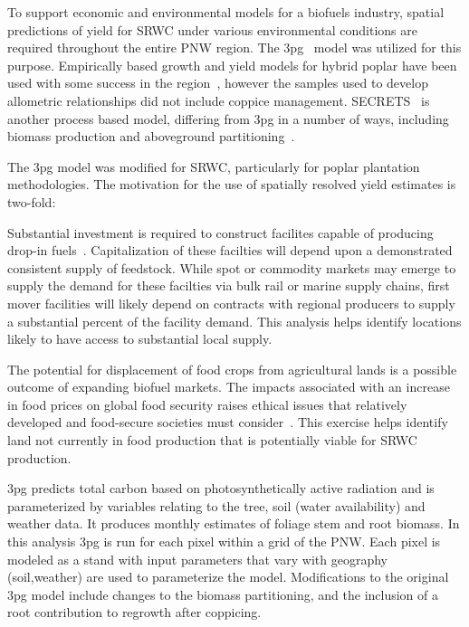 \documentclass[preprint,12pt]{elsarticle}
\begin{document}
To support economic and environmental models for a biofuels industry,
spatial predictions of yield for \acf{SRWC} under various
environmental conditions are required throughout the entire \acf{PNW}
region.  The
\acf{3pg}~\cite{landsberg2010physiological,Landsberg1997,Sands2004}
model was utilized for this purpose.  Empirically based growth and
yield models for hybrid poplar have been used with some success in the
region~\cite{Clendenen1996}, however the samples used to develop
allometric relationships did not include coppice management.
\ac{SECRETS}~\cite{Sampson2001} is another process based model,
differing from \ac{3pg} in a number of ways, including biomass
production and aboveground partitioning~\cite{SurendranNair2012}.

The \ac{3pg} model was modified for \ac{SRWC}, particularly
for poplar plantation methodologies. The motivation for the use of
spatially resolved yield estimates is two-fold:
\begin{description}
\item[Biofuels production system optimization] Substantial investment
  is required to construct facilites capable of producing drop-in
  fuels~\cite{Parker2010a}. Capitalization of these facilties will
  depend upon a demonstrated
  consistent supply of feedstock. While spot or commodity markets may
  emerge to supply the demand for these facilties via bulk rail or
  marine supply chains, first mover facilities will
  likely depend on contracts with regional producers to supply a
  substantial percent of the facility demand. This analysis helps
  identify locations likely to have access to substantial local
  supply.
\item[Land use] The potential for displacement of food crops from
  agricultural lands is a possible outcome of expanding biofuel
  markets.
  The impacts associated with an increase in food prices on global
  food security raises ethical issues that relatively developed and
  food-secure societies must consider~\cite{Pimentel2008}. This
  exercise helps identify land not currently in food production that
  is potentially viable for \ac{SRWC} production.
\item
\end{description}

\ac{3pg} predicts total carbon based on photosynthetically active
radiation and is parameterized by variables relating to the tree, soil
(water availability) and weather data. It produces monthly estimates
of foliage stem and root biomass. In this analysis \ac{3pg} is run for
each pixel within a grid of the \ac{PNW}. Each pixel is modeled as a
stand with input parameters that vary with geography (soil,weather)
are used to parameterize the model. Modifications to the original
\ac{3pg} model include changes to the biomass partitioning, and the
inclusion of a root contribution to regrowth after coppicing.
\end{document}
